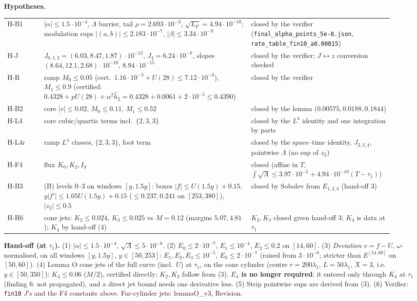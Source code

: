 \documentclass[11pt]{article}
\begin{document}
\noindent\textbf{Hypotheses.}
\begin{center}\begin{tabular}{p{0.09\linewidth}p{0.50\linewidth}p{0.33\linewidth}}
H-B1 & $|\alpha|\le1.5\cdot10^{-4}$, $\Lambda$ barrier, tail $\rho=2.693\cdot10^{-3}$, $\sqrt{L_F}=4.94\cdot10^{-10}$; modulation sups $|(a,b)|\le2.183\cdot10^{-7}$, $|\beta|\le3.34\cdot10^{-9}$ & closed by the verifier (\texttt{final\_alpha\_points\_5e-8.json}, \texttt{rate\_table\_fin10\_a0.00015})\\
H-J & $J_{0,1,2}=(6.03,8.47,1.87)\cdot10^{-12}$, $J_4=6.24\cdot10^{-8}$, slopes $(8.64,12.1,2.68)\cdot10^{-19}$, $8.94\cdot10^{-15}$ & closed by the verifier; $J\leftrightarrow z$ conversion checked\\
H-R & ramp $M_0\le0.05$ (cert.\ $1.16\cdot10^{-3}+U(28)\le7.12\cdot10^{-3}$), $M_1\le0.9$ (certified: $0.4328+pU(28)+\alpha^2\hat h_2=0.4328+0.0061+2\cdot10^{-5}\le0.4390$) & closed by the verifier\\
H-B2 & core $|v|\le0.02$, $M_0\le0.11$, $M_1\le0.52$ & closed by the lemma ($0.00575,0.0188,0.1844$)\\
H-L4 & core cubic/quartic terms incl.\ $\{2,3,3\}$ & closed by the $L^4$ identity and one integration by parts\\
H-L4r & ramp $L^4$ classes, $\{2,3,3\}$, foot term & closed by the space--time identity, $J_{2,3,4}$, pointwise $\Lambda$ (no sup of $z_2$)\\
H-F4 & flux $K_0,K_2,I_3$ & closed (affine in $T$, $\int\sqrt\Lambda\le3.97\cdot10^{-5}+4.94\cdot10^{-10}(T-\tau_1)$)\\
H-B3 & (B) levels 0--3 on windows $[y,1.5y]$: boxes $|f|\le U(1.5y)+0.15$, $y|f'|\le1.05U(1.5y)+0.15$ ($\le0.237,0.241$ on $[253,380]$), $|z_2|\le0.5$ & closed by Sobolev from $E_{1,2,3}$ (hand-off 3)\\
H-H6 & cone jets: $K_2\le0.024$, $K_3\le0.025$ vs $M=0.12$ (margins $5.07,4.81$); $K_4$ by hand-off (4) & $K_2,K_3$ closed given hand-off 3; $K_4$ is data at $\tau_1$\\
\end{tabular}\end{center}
\noindent\textbf{Hand-off (at $\tau_1$).} (1) $|\alpha|\le1.5\cdot10^{-4}$, $\sqrt\Lambda\le5\cdot10^{-8}$. (2) $E_0\le2\cdot10^{-7}$, $E_1\le10^{-4}$, $E_2\le0.2$ on $[14,60]$. (3) \emph{Deviation} $v=f-U$, $\omega$-normalised, on all windows $[y,1.5y]$, $y\in[50,253]$: $E_1,E_2,E_3\le10^{-5}$, $E_0\le2\cdot10^{-7}$ (raised from $3\cdot10^{-6}$; stricter than $E^{[14,60]}$ on $[50,60]$). (4) Lemma O cone jets of the full curve (incl.\ $U$) at $\tau_1$, on the cone cylinder (centre $r=200\lambda_1$, $L=50\lambda_1$, $X=3$, i.e.\ $y\in[50,350]$): $K_4\le0.06$ ($M/2$), certified directly; $K_2,K_3$ follow from (3). \textbf{$E_4$ is no longer required}: it entered only through $K_4$ at $\tau_1$ (finding 6: not propagated), and a direct jet bound needs one derivative less. (5) Strip pointwise sups are derived from (3). (6) Verifier: \texttt{fin10} $J$'s and the F4 constants above. Far-cylinder jets: lemmaO\_v3, Revision.
\end{document}
